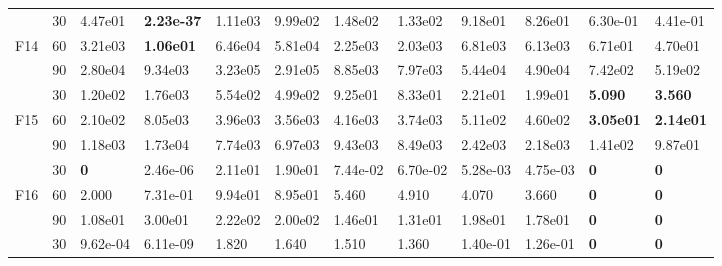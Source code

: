\begin{table}
\begin{center}
\begin{tabular}{p{0.3in} | p{0.4in} | p{0.6in} |  p{0.6in} |  p{0.6in}|  p{0.6in} |  p{0.6in} | p{0.6in} |  p{0.6in} | p{0.6in} |  p{0.6in} |  p{0.6in}}
\hline                                                                                                            
    &    30    &    4.47e01    &\textbf{    2.23e-37    }&    1.11e03    &    9.99e02    &    1.48e02    &    1.33e02    &    9.18e01    &    8.26e01    &    {    6.30e-01    }&    {    4.41e-01    }\\
F14    &    60    &    3.21e03    &\textbf{    1.06e01    }&    6.46e04    &    5.81e04    &    2.25e03    &    2.03e03    &    6.81e03    &    6.13e03    &            6.71e01    &    {    4.70e01    }\\
    &    90    &    2.80e04    &    9.34e03    &    3.23e05    &    2.91e05    &    8.85e03    &    7.97e03    &    5.44e04    &    4.90e04    &    {    7.42e02    }&    {    5.19e02    }\\
\hline                                                                                                            
    &    30    &    1.20e02    &    1.76e03    &    5.54e02    &    4.99e02    &    9.25e01    &    8.33e01    &    2.21e01    &{    1.99e01    }&    \textbf{    5.090    }&    \textbf{    3.560    }\\
F15    &    60    &    2.10e02    &    8.05e03    &    3.96e03    &    3.56e03    &    4.16e03    &    3.74e03    &    5.11e02    &    4.60e02    &    \textbf{    3.05e01    }&    \textbf{    2.14e01    }\\
    &    90    &    1.18e03    &    1.73e04    &    7.74e03    &    6.97e03    &    9.43e03    &    8.49e03    &    2.42e03    &    2.18e03    &    {    1.41e02    }&    {    9.87e01    }\\
\hline                                                                                                            
    &    30    &\textbf{    0    }&    2.46e-06    &    2.11e01    &    1.90e01    &    7.44e-02    &    6.70e-02    &    5.28e-03    &    4.75e-03    &    \textbf{    0    }&    \textbf{    0    }\\
F16    &    60    &    2.000    &{    7.31e-01    }&    9.94e01    &    8.95e01    &    5.460    &    4.910    &    4.070    &    3.660    &    \textbf{    0    }&    \textbf{    0    }\\
    &    90    &{    1.08e01    }&    3.00e01    &    2.22e02    &    2.00e02    &    1.46e01    &    1.31e01    &    1.98e01    &    1.78e01    &    \textbf{    0    }&    \textbf{    0    }\\
\hline                                                                                                            
    &    30    &    9.62e-04    &{    6.11e-09    }&    1.820    &    1.640    &    1.510    &    1.360    &    1.40e-01    &    1.26e-01    &    \textbf{    0    }&    \textbf{    0    }\\

\end{tabular}
\end{center}
\end{table}
